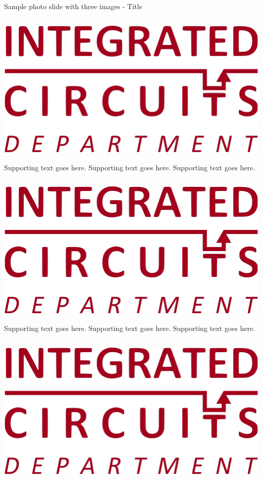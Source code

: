 \documentclass[aspectratio=169, t, 9pt]{beamer} %
\begin{document}
\begin{frame}{Sample photo slide with three images - Title}
\begin{groupcolumns}
    \begin{column}{0.3\textwidth}
        \includegraphics[width=\textwidth]{./template/images/IC.pdf}%


        Supporting text goes here. Supporting text goes here. Supporting text goes here.
    \end{column}
    \vspace{0.05\textwidth}
    \begin{column}{0.3\textwidth}
        \includegraphics[width=\textwidth]{./template/images/IC.pdf}%


        Supporting text goes here. Supporting text goes here. Supporting text goes here.
    \end{column}
    \vspace{0.05\textwidth}
    \begin{column}{0.3\textwidth}
        \includegraphics[width=\textwidth]{./template/images/IC.pdf}%


\end{column}
\end{groupcolumns}
\end{frame}
\end{document}
